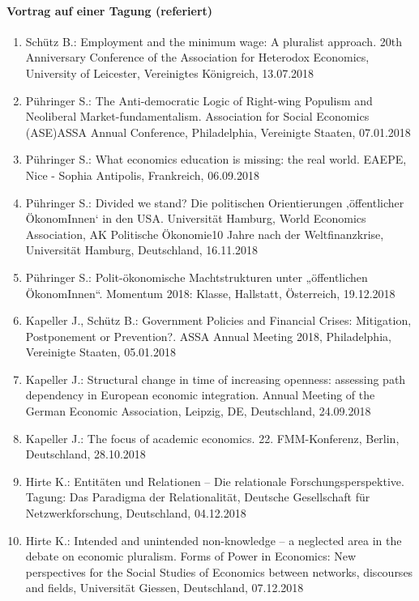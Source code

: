    \paragraph{Vortrag auf einer Tagung (referiert)}
\begin{enumerate}
	\item Schütz B.: Employment and the minimum wage: A pluralist approach. 20th Anniversary Conference of the Association for Heterodox Economics, University of Leicester, Vereinigtes Königreich, 13.07.2018
	\item Pühringer S.: The Anti-democratic Logic of Right-wing Populism and Neoliberal Market-fundamentalism. Association for Social Economics (ASE)ASSA Annual Conference, Philadelphia, Vereinigte Staaten, 07.01.2018
	\item Pühringer S.: What economics education is missing: the real world. EAEPE, Nice - Sophia Antipolis, Frankreich, 06.09.2018
	\item Pühringer S.: Divided we stand? Die politischen Orientierungen ‚öffentlicher ÖkonomInnen‘ in den USA. Universität Hamburg, World Economics Association, AK Politische Ökonomie10 Jahre nach der Weltfinanzkrise, Universität Hamburg, Deutschland, 16.11.2018
	\item Pühringer S.: Polit-ökonomische Machtstrukturen unter „öffentlichen ÖkonomInnen“. Momentum 2018: Klasse, Hallstatt, Österreich, 19.12.2018
	\item Kapeller J., Schütz B.: Government Policies and Financial Crises: Mitigation, Postponement or Prevention?. ASSA Annual Meeting 2018, Philadelphia, Vereinigte Staaten, 05.01.2018
	\item Kapeller J.: Structural change in time of increasing openness: assessing path dependency in European economic integration. Annual Meeting of the German Economic Association, Leipzig, DE, Deutschland, 24.09.2018
	\item Kapeller J.: The focus of academic economics. 22. FMM-Konferenz, Berlin, Deutschland, 28.10.2018
	\item Hirte K.: Entitäten und Relationen – Die relationale Forschungsperspektive. Tagung: Das Paradigma der Relationalität, Deutsche Gesellschaft für Netzwerkforschung, Deutschland, 04.12.2018
	\item Hirte K.: Intended and unintended non-knowledge – a neglected area in the debate on economic pluralism. Forms of Power in Economics: New perspectives for the Social Studies of Economics between networks, discourses and fields, Universität Giessen, Deutschland, 07.12.2018

\end{enumerate}
